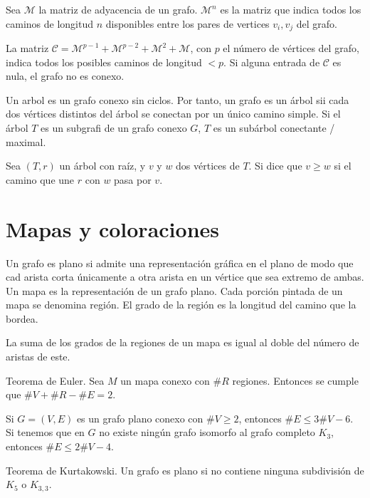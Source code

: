 \documentclass[a4paper]{article}
\begin{document}
Sea $\mathcal{M}$ la matriz de adyacencia de un grafo. $\mathcal{M}^n$ es la matriz que indica todos los caminos de longitud $n$ disponibles entre los pares de vertices $v_i,v_j$ del grafo. 

\hrulefill

La matriz $\mathcal{C} = \mathcal{M}^{p-1}+\mathcal{M}^{p-2}+\mathcal{M}^2+\mathcal{M}$, con $p$ el número de vértices del grafo, indica todos los posibles caminos de longitud $<p$. Si alguna entrada de $\mathcal{C}$ es nula, el grafo no es conexo.

\hrulefill

Un arbol es un grafo conexo sin ciclos. Por tanto, un grafo es un árbol sii cada dos vértices distintos del árbol se conectan por un único camino simple. Si el árbol $T$ es un subgrafi de un grafo conexo $G$, $T$ es un subárbol conectante / maximal.

\hrulefill

Sea $(T,r)$ un árbol con raíz, y $v$ y $w$ dos vértices de $T$. Si dice que $v \ge w$ si el camino que une $r$ con  $w$ pasa por $v$.

\section*{Mapas y coloraciones}

Un grafo es plano si admite una representación gráfica en el plano de modo que cad arista corta únicamente a otra arista en un vértice que sea extremo de ambas. Un mapa es la representación de un grafo plano. Cada porción pintada de un mapa se denomina región. El grado de la región es la longitud del camino que la bordea.

\hrulefill

La suma de los grados de la regiones de un mapa es igual al doble del número de aristas de este.

\hrulefill

Teorema de Euler. Sea $M$ un mapa conexo con $\#R$ regiones. Entonces se cumple que $\#V + \#R - \#E = 2$.

\hrulefill

Si $G=(V,E)$ es un grafo plano conexo con $\#V \ge 2$, entonces $\#E \le 3\#V-6$. Si tenemos que en $G$ no existe ningún grafo isomorfo al grafo completo $K_3$, entonces $\#E \le 2\#V-4$.

\hrulefill

Teorema de Kurtakowski. Un grafo es plano si no contiene ninguna subdivisión de $K_5$ o $K_{3,3}$.
\end{document}
